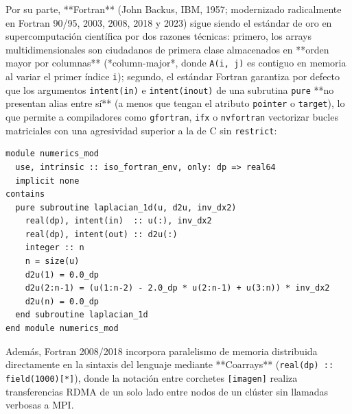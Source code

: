 \documentclass{book}
\begin{document}
Por su parte, **Fortran** (John Backus, IBM, 1957; modernizado radicalmente en Fortran 90/95, 2003, 2008, 2018 y 2023) sigue siendo el estándar de oro en supercomputación científica por dos razones técnicas: primero, los arrays multidimensionales son ciudadanos de primera clase almacenados en **orden mayor por columnas** (*column-major*, donde \texttt{A(i, j)} es contiguo en memoria al variar el primer índice \texttt{i}); segundo, el estándar Fortran garantiza por defecto que los argumentos \texttt{intent(in)} e \texttt{intent(inout)} de una subrutina \texttt{pure} **no presentan alias entre sí** (a menos que tengan el atributo \texttt{pointer} o \texttt{target}), lo que permite a compiladores como \texttt{gfortran}, \texttt{ifx} o \texttt{nvfortran} vectorizar bucles matriciales con una agresividad superior a la de C sin \texttt{restrict}:
\begin{lstlisting}[style=studium]
module numerics_mod
  use, intrinsic :: iso_fortran_env, only: dp => real64
  implicit none
contains
  pure subroutine laplacian_1d(u, d2u, inv_dx2)
    real(dp), intent(in)  :: u(:), inv_dx2
    real(dp), intent(out) :: d2u(:)
    integer :: n
    n = size(u)
    d2u(1) = 0.0_dp
    d2u(2:n-1) = (u(1:n-2) - 2.0_dp * u(2:n-1) + u(3:n)) * inv_dx2
    d2u(n) = 0.0_dp
  end subroutine laplacian_1d
end module numerics_mod
\end{lstlisting}
Además, Fortran 2008/2018 incorpora paralelismo de memoria distribuida directamente en la sintaxis del lenguaje mediante **Coarrays** (\texttt{real(dp) :: field(1000)[*]}), donde la notación entre corchetes \texttt{[imagen]} realiza transferencias RDMA de un solo lado entre nodos de un clúster sin llamadas verbosas a MPI.
\end{document}
